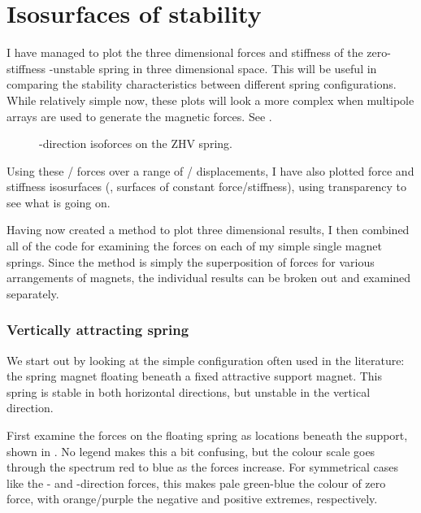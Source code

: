 \documentclass[11pt,a4paper]{memoir}
\begin{document}
\section{Isosurfaces of stability}

I have managed to plot the three dimensional forces and stiffness of
the zero-stiffness \x-unstable spring in three dimensional space. This
will be useful in comparing the stability characteristics between
different spring configurations. While relatively simple now, these
plots will look a more complex when multipole arrays are used to
generate the magnetic forces. See .

\begin{figure}
   \centering
   \caption{\x-direction isoforces on the ZHV spring.}
\end{figure}

Using these \threeD/ forces over a range of \threeD/ displacements, I have
also plotted force and stiffness isosurfaces (\ie, surfaces of constant
force/stiffness), using transparency to see what is going on.

Having now created a method to plot three dimensional results, I then combined
all of the code for examining the forces on each of my simple single magnet
springs. Since the method is simply the superposition of forces for various
arrangements of magnets, the individual results can be broken out and examined
separately.

\subsubsection{Vertically attracting spring}

We start out by looking at the simple configuration often used in the
literature: the spring magnet floating beneath a fixed attractive support
magnet. This spring is stable in both horizontal directions, but unstable in
the vertical direction.

First examine the forces on the floating spring as locations beneath the
support, shown in . No legend makes this a bit confusing,
but the colour scale goes through the spectrum red to blue as the forces
increase. For symmetrical cases like the \x- and \y-direction forces, this
makes pale green-blue the colour of zero force, with orange/purple the
negative and positive extremes, respectively.
\end{document}

